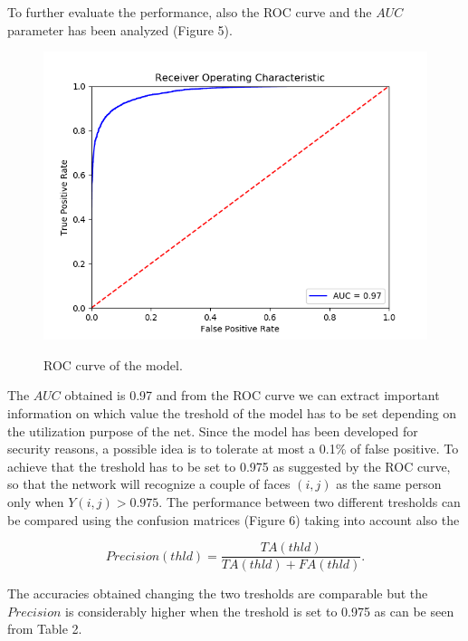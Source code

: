 To further evaluate the performance, also the ROC curve and the $AUC$ parameter has been analyzed (Figure 5).

\begin{figure}[t]
\begin{center}
\includegraphics[width=0.8\linewidth]{images/FINAL_ROC.png}
   \caption{ROC curve of the model.}
\label{fig:long}
\label{fig:onecol}
\end{center}
\end{figure}

The $AUC$ obtained is 0.97 and from the ROC curve we can extract important information on which value the treshold of the model has to be set depending on the utilization purpose of the net.
Since the model has been developed for security reasons, a possible idea is to tolerate at most a 0.1\% of false positive. To achieve that the treshold has to be set to 0.975 as suggested by the ROC curve, so that the network will recognize a couple of faces $(i,j)$ as the same person only when $Y(i,j)>0.975$. The performance between two different tresholds can be compared using the confusion matrices (Figure 6) taking into account also the

\begin{equation}
Precision(thld) = \frac{TA(thld)}{TA(thld)+FA(thld)}. 
\end{equation}
 
The accuracies obtained changing the two tresholds are comparable but the $Precision$ is considerably higher when the treshold is set to 0.975 as can be seen from Table 2.

